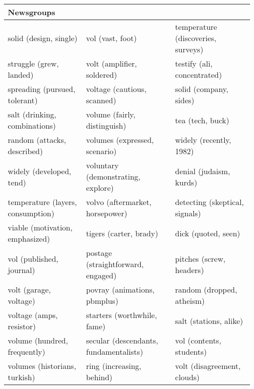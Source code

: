 \begin{table}[]
\begin{tabular}{lll}
		\textbf{Newsgroups}                               &                                                   &                                                          \\
		\toprule
		solid (design, single)                   & vol (vast, foot)                                  & temperature (discoveries, surveys)                       \\
		struggle (grew, landed)                  & volt (amplifier, soldered)                        & testify (ali, concentrated)                              \\
		spreading (pursued, tolerant)            & voltage (cautious, scanned)                       & solid (company, sides)                                   \\
		salt (drinking, combinations)            & volume (fairly, distinguish)                      & tea (tech, buck)                                         \\
		random (attacks, described)              & volumes (expressed, scenario)                     & widely (recently, 1982)                                  \\
		widely (developed, tend)                 & voluntary (demonstrating, explore)                & denial (judaism, kurds)                                  \\
		temperature (layers, consumption)        & volvo (aftermarket, horsepower)                   & detecting (skeptical, signals)                           \\
		viable (motivation, emphasized)          & tigers (carter, brady)                            & dick (quoted, seen)                                      \\
		vol (published, journal)                 & postage (straightforward, engaged)                & pitches (screw, headers)                                 \\
		volt (garage, voltage)                   & povray (animations, pbmplus)                      & random (dropped, atheism)                                \\
		voltage (amps, resistor)                 & starters (worthwhile, fame)                       & salt (stations, alike)                                   \\
		volume (hundred, frequently)             & secular (descendants, fundamentalists)            & vol (contents, students)                                 \\
		volumes (historians, turkish)            & ring (increasing, behind)                         & volt (disagreement, clouds)                              \\

\end{tabular}
\end{table}
